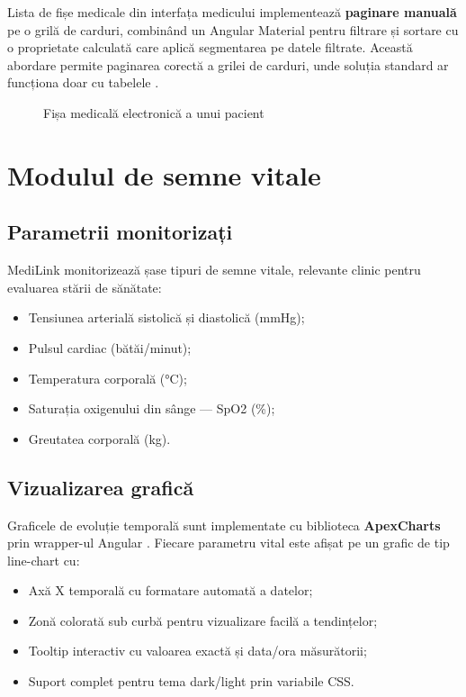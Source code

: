 Lista de fișe medicale din interfața medicului implementează \textbf{paginare manuală} pe o grilă de carduri, combinând un  Angular Material pentru filtrare și sortare cu o proprietate calculată care aplică segmentarea pe datele filtrate. Această abordare permite paginarea corectă a grilei de carduri, unde soluția standard  ar funcționa doar cu tabelele .

\begin{figure}[H]
  \centering
  \caption{Fișa medicală electronică a unui pacient}
  \label{fig:fisa_medicala}
\end{figure}

\section{Modulul de semne vitale}

\subsection{Parametrii monitorizați}

MediLink monitorizează șase tipuri de semne vitale, relevante clinic pentru evaluarea stării de sănătate:
\begin{itemize}
  \item Tensiunea arterială sistolică și diastolică (mmHg);
  \item Pulsul cardiac (bătăi/minut);
  \item Temperatura corporală (°C);
  \item Saturația oxigenului din sânge — SpO2 (\%);
  \item Greutatea corporală (kg).
\end{itemize}

\subsection{Vizualizarea grafică}

Graficele de evoluție temporală sunt implementate cu biblioteca \textbf{ApexCharts} \cite{apexcharts2024} prin wrapper-ul Angular . Fiecare parametru vital este afișat pe un grafic de tip line-chart cu:
\begin{itemize}
  \item Axă X temporală cu formatare automată a datelor;
  \item Zonă colorată sub curbă pentru vizualizare facilă a tendințelor;
  \item Tooltip interactiv cu valoarea exactă și data/ora măsurătorii;
  \item Suport complet pentru tema dark/light prin variabile CSS.
\end{itemize}

